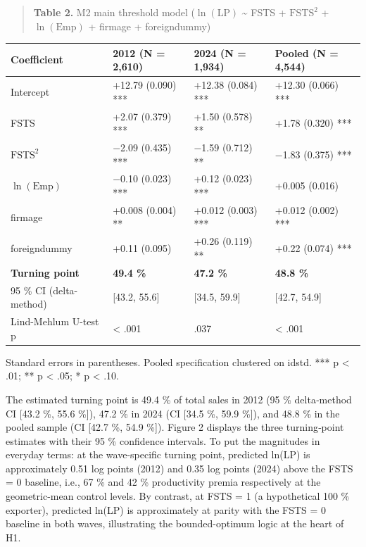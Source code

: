 \documentclass[12pt,a4paper]{article}
\begin{document}
\begin{quote}
\textbf{Table 2.} M2 main threshold model (\(\ln(\mathrm{LP})\)
\textasciitilde{} FSTS + \(\mathrm{FSTS}^2\) + \(\ln(\mathrm{Emp})\) +
firmage + foreigndummy)
\end{quote}

\begin{longtable}[]{@{}llll@{}}
\toprule\noalign{}
Coefficient & 2012 (N = 2,610) & 2024 (N = 1,934) & Pooled (N =
4,544) \\
\midrule\noalign{}
\endhead
\bottomrule\noalign{}
\endlastfoot
Intercept & +12.79 (0.090) *** & +12.38 (0.084) *** & +12.30 (0.066)
*** \\
FSTS & +2.07 (0.379) *** & +1.50 (0.578) ** & +1.78 (0.320) *** \\
\(\mathrm{FSTS}^2\) & −2.09 (0.435) *** & −1.59 (0.712) ** & −1.83
(0.375) *** \\
\(\ln(\mathrm{Emp})\) & −0.10 (0.023) *** & +0.12 (0.023) *** & +0.005
(0.016) \\
firmage & +0.008 (0.004) ** & +0.012 (0.003) *** & +0.012 (0.002) *** \\
foreigndummy & +0.11 (0.095) & +0.26 (0.119) ** & +0.22 (0.074) *** \\
\textbf{Turning point} & \textbf{49.4 \%} & \textbf{47.2 \%} &
\textbf{48.8 \%} \\
95 \% CI (delta-method) & {[}43.2, 55.6{]} & {[}34.5, 59.9{]} & {[}42.7,
54.9{]} \\
Lind-Mehlum U-test p & \textless{} .001 & .037 & \textless{} .001 \\
\end{longtable}

Standard errors in parentheses. Pooled specification clustered on idstd.
*** p \textless{} .01; ** p \textless{} .05; * p \textless{} .10.

The estimated turning point is 49.4 \% of total sales in 2012 (95 \%
delta‑method CI {[}43.2 \%, 55.6 \%{]}), 47.2 \% in 2024 (CI {[}34.5 \%,
59.9 \%{]}), and 48.8 \% in the pooled sample (CI {[}42.7 \%, 54.9
\%{]}). Figure 2 displays the three turning‑point estimates with their
95 \% confidence intervals. To put the magnitudes in everyday terms: at
the wave-specific turning point, predicted ln(LP) is approximately 0.51
log points (2012) and 0.35 log points (2024) above the FSTS = 0
baseline, i.e., 67 \% and 42 \% productivity premia respectively at the
geometric-mean control levels. By contrast, at FSTS = 1 (a hypothetical
100 \% exporter), predicted ln(LP) is approximately at parity with the
FSTS = 0 baseline in both waves, illustrating the bounded-optimum logic
at the heart of H1.
\end{document}
